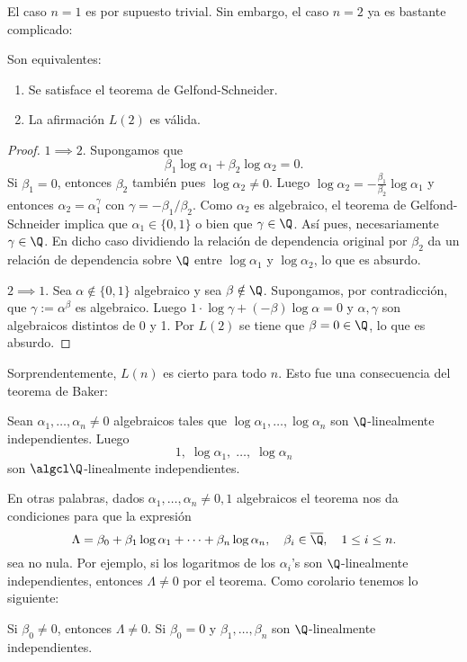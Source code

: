 \documentclass[11pt, reqno]{amsart}
\begin{document}
El caso $n=1$ es por supuesto trivial. Sin embargo, el caso $n=2$ ya es bastante complicado:
\begin{prop}
	Son equivalentes:
	\begin{enumerate}
		\item Se satisface el teorema de Gelfond-Schneider.
		\item La afirmación $L(2)$ es válida.
	\end{enumerate}
\end{prop}
\begin{proof}
	$1 \implies 2$. Supongamos que
	\[
		\beta_1\log\alpha_1 + \beta_2\log\alpha_2 = 0.
	\]
	Si $\beta_1=0$, entonces $\beta_2$ también pues $\log\alpha_2\neq 0$.
	Luego $\log\alpha_2=-\frac{\beta_1}{\beta_2}\log\alpha_1$ y entonces $\alpha_2=\alpha_1^{\gamma}$ con $\gamma=-\beta_1/\beta_2$.
	Como $\alpha_2$ es algebraico, el teorema de Gelfond-Schneider implica que $\alpha_1 \in \{ 0, 1 \}$ o bien que $\gamma\in \Q$.
	Así pues, necesariamente $\gamma \in \Q$.
	En dicho caso dividiendo la relación de dependencia original por $\beta_2$ da un relación de dependencia sobre $\Q$ entre $\log\alpha_1$ y
	$\log\alpha_2$, lo que es absurdo.

	$2 \implies 1$. Sea $\alpha \notin \{ 0, 1 \}$ algebraico y sea $\beta\notin \Q$.
	Supongamos, por contradicción, que $\gamma:=\alpha^{\beta}$ es algebraico.
	Luego $1\cdot \log\gamma+ (-\beta)\log\alpha=0$ y $\alpha,\gamma$ son algebraicos distintos de 0 y 1.
	Por $L(2)$ se tiene que $\beta=0\in \Q$, lo que es absurdo.
\end{proof}

Sorprendentemente, $L(n)$ es cierto para todo $n$. Esto fue una consecuencia del teorema de Baker:
\begin{thm}[Baker, 1966]
	Sean $\alpha_1,\ldots,\alpha_n\neq 0$ algebraicos tales que $\log\alpha_1,\ldots,\log\alpha_n$ son $\Q$-linealmente independientes. Luego
	\[
		1, \; \log\alpha_1, \; \ldots, \; \log\alpha_n
	\]
	son $\algcl\Q$-linealmente independientes.
\end{thm}

En otras palabras, dados $\alpha_1,\ldots,\alpha_n\neq 0,1$ algebraicos el teorema nos da condiciones para que la expresión
\[
	\Lambda=\beta_0+\beta_1\log\alpha_1+\cdots+\beta_n\log\alpha_n,\quad\beta_i\in \overline{\Q},\quad 1\leq i\leq n.
\]
sea no nula. Por ejemplo, si los logaritmos de los $\alpha_i$'s son $\Q$-linealmente independientes, entonces $\Lambda\neq 0$ por el teorema.
Como corolario tenemos lo siguiente:
\begin{cor}
	Si $\beta_0\neq 0$, entonces $\Lambda\neq 0$. 
	Si $\beta_0=0$ y $\beta_1,\ldots,\beta_n$ son $\Q$-linealmente independientes.
\end{cor}
\end{document}
